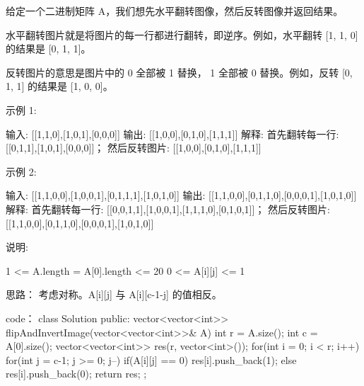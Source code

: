 给定一个二进制矩阵 A，我们想先水平翻转图像，然后反转图像并返回结果。

水平翻转图片就是将图片的每一行都进行翻转，即逆序。例如，水平翻转 [1, 1, 0] 的结果是 [0, 1, 1]。

反转图片的意思是图片中的 0 全部被 1 替换， 1 全部被 0 替换。例如，反转 [0, 1, 1] 的结果是 [1, 0, 0]。

示例 1:

输入: [[1,1,0],[1,0,1],[0,0,0]]
输出: [[1,0,0],[0,1,0],[1,1,1]]
解释: 首先翻转每一行: [[0,1,1],[1,0,1],[0,0,0]]；
     然后反转图片: [[1,0,0],[0,1,0],[1,1,1]]

示例 2:

输入: [[1,1,0,0],[1,0,0,1],[0,1,1,1],[1,0,1,0]]
输出: [[1,1,0,0],[0,1,1,0],[0,0,0,1],[1,0,1,0]]
解释: 首先翻转每一行: [[0,0,1,1],[1,0,0,1],[1,1,1,0],[0,1,0,1]]；
     然后反转图片: [[1,1,0,0],[0,1,1,0],[0,0,0,1],[1,0,1,0]]

说明:

    1 <= A.length = A[0].length <= 20
    0 <= A[i][j] <= 1





























思路：
考虑对称。A[i][j] 与 A[i][c-1-j] 的值相反。





























code：
class Solution {
public:
    vector<vector<int>> flipAndInvertImage(vector<vector<int>>& A) {
        int r = A.size();
        int c = A[0].size();
        vector<vector<int>> res(r, vector<int>());
        for(int i = 0; i < r; i++)
        {
            for(int j = c-1; j >= 0; j--)
            {
                if(A[i][j] == 0)
                    res[i].push_back(1);
                else res[i].push_back(0);
            }
        }
        return res;
    }
};